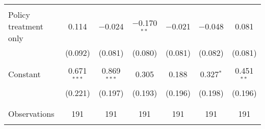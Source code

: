 \begin{tabular}{@{\extracolsep{5pt}}lcccccc}
  & & & & & & \\ 
 Policy treatment only & 0.114 & $-$0.024 & $-$0.170$^{**}$ & $-$0.021 & $-$0.048 & 0.081 \\ 
  & (0.092) & (0.081) & (0.080) & (0.081) & (0.082) & (0.081) \\ 
  & & & & & & \\ 
 Constant & 0.671$^{***}$ & 0.869$^{***}$ & 0.305 & 0.188 & 0.327$^{*}$ & 0.451$^{**}$ \\ 
  & (0.221) & (0.197) & (0.193) & (0.196) & (0.198) & (0.196) \\ 
  & & & & & & \\ 
\hline \\[-1.8ex] 

Observations & 191 & 191 & 191 & 191 & 191 & 191 \\ 
\hline 
\hline \\[-1.8ex] 
\end{tabular} 